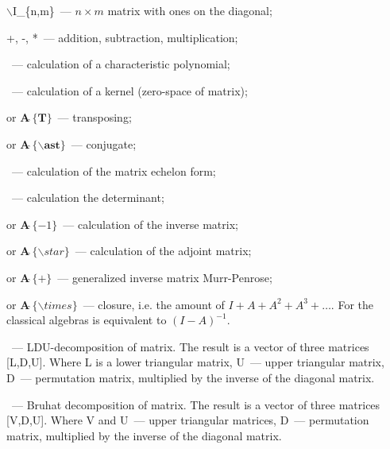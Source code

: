 $\backslash$I\_\{n,m\}~---  $n \times m$  matrix with ones on the diagonal;

+, -, *~--- addition, subtraction, multiplication; 

~---  calculation of a characteristic polynomial; 
 
~--- calculation of a kernel (zero-space of matrix); 

 or  $\mathbf{A \widehat{\ } \{T\}}$~--- transposing;  
 
 or  $\mathbf{A\widehat{\ }\{\backslash ast\}}$~--- conjugate;

~---   calculation of the matrix echelon form;  

~---   calculation the determinant; 
 
  or  $\mathbf{A}\widehat{\ }\{-1\}$~---  calculation of the inverse matrix; 

  or  $\mathbf{A}\widehat{\ }\{\backslash star\}$~--- calculation of the adjoint matrix;  
 
  or $\mathbf{A}\widehat{\ }\{+\}$~--- generalized inverse matrix Murr-Penrose;
 
   or $\mathbf{A}\widehat{\ }\{\backslash times\}$~--- closure, i.e. the amount of 
$ I + A + A^2 + A^3 + \ldots $. 
For the classical algebras is equivalent to $ (I-A)^{-1} $.

~--- LDU-decomposition of matrix. The result is a vector of three matrices [L,D,U]. Where L is a lower triangular matrix, U~--- upper triangular matrix, 
D~--- permutation matrix, multiplied by the inverse of the diagonal matrix. 

~--- Bruhat decomposition of matrix. The result is a vector of three matrices [V,D,U]. Where V and U~--- upper triangular matrices, 
D~--- permutation matrix, multiplied by the inverse of the diagonal matrix.

  
